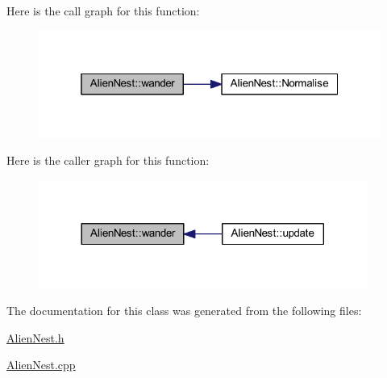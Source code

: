 Here is the call graph for this function\+:
\nopagebreak
\begin{figure}[H]
\begin{center}
\leavevmode
\includegraphics[width=319pt]{class_alien_nest_ac2679698409238879ace3367ceba6d9d_cgraph}
\end{center}
\end{figure}
Here is the caller graph for this function\+:
\nopagebreak
\begin{figure}[H]
\begin{center}
\leavevmode
\includegraphics[width=305pt]{class_alien_nest_ac2679698409238879ace3367ceba6d9d_icgraph}
\end{center}
\end{figure}


The documentation for this class was generated from the following files\+:\begin{DoxyCompactItemize}
\item 
\hyperlink{_alien_nest_8h}{Alien\+Nest.\+h}\item 
\hyperlink{_alien_nest_8cpp}{Alien\+Nest.\+cpp}\end{DoxyCompactItemize}
